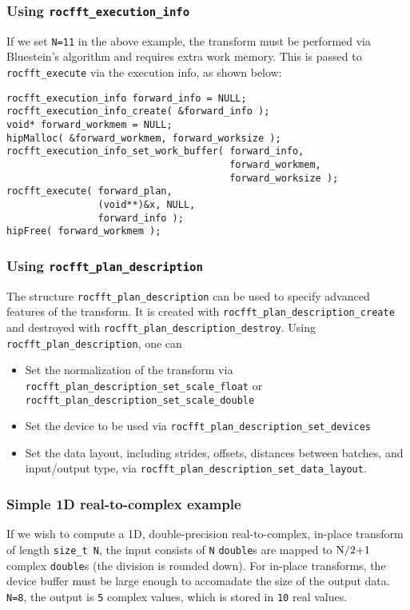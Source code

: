 \documentclass[10pt]{article}
\renewcommand{\(}{\left(}
\renewcommand{\)}{\right)}
\begin{document}
\subsubsection{Using \lstinline{rocfft_execution_info}}
If we set \lstinline{N=11} in the above example, the transform
must be performed via Bluestein's algorithm and requires extra work
memory.  This is passed to \lstinline{rocfft_execute} via the
execution info, as shown below:
\begin{lstlisting}
rocfft_execution_info forward_info = NULL;
rocfft_execution_info_create( &forward_info );
void* forward_workmem = NULL;
hipMalloc( &forward_workmem, forward_worksize );
rocfft_execution_info_set_work_buffer( forward_info,
                                       forward_workmem,
                                       forward_worksize );
rocfft_execute( forward_plan,
                (void**)&x, NULL,
                forward_info );
hipFree( forward_workmem );
\end{lstlisting}

\subsubsection{Using \lstinline{rocfft_plan_description}}

The structure \lstinline{rocfft_plan_description} can be used to
specify advanced features of the transform.  It is created with
\lstinline{rocfft_plan_description_create} and destroyed with
\lstinline{rocfft_plan_description_destroy}.  Using
\lstinline{rocfft_plan_description}, one can
\begin{itemize}
\item Set the normalization of the transform via
  \lstinline{rocfft_plan_description_set_scale_float} or
  \lstinline{rocfft_plan_description_set_scale_double}
\item Set the device to be used via
  \lstinline{rocfft_plan_description_set_devices}
\item Set the data layout, including strides, offsets, distances
  between batches, and input/output type, via
  \lstinline{rocfft_plan_description_set_data_layout}.
\end{itemize}

\subsubsection{Simple 1D real-to-complex example}
If we wish to compute a 1D, double-precision real-to-complex, in-place
transform of length \lstinline{size_t N}, the input consists of
\lstinline{N} \lstinline{double}s are mapped to
$\text{\lstinline{N/2+1}}$ complex \lstinline{double}s (the division
is rounded down).  For in-place transforms, the device buffer must be
large enough to accomadate the size of the output
data. \lstinline{N=8}, the output is \lstinline{5} complex
values, which is stored in \lstinline{10} real values.
\end{document}
